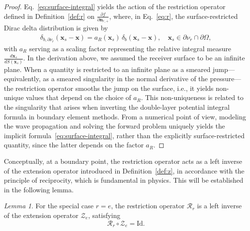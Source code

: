 \documentclass[11pt,reqno]{amsart}
\theoremstyle{remark}
\theoremstyle{italic_lemma}
\newtheorem{lemma}{Lemma}
\newcommand{\bx}{\boldsymbol{x}}
\newcommand{\bn}{\boldsymbol{n}}
\begin{document}
\begin{proof}
\noindent
Eq.~\eqref{eq:surface-integral} yields the action of the restriction operator 
defined in Definition~\ref{def:r} on \(\tfrac{\partial f}{\partial \bn_{r,+}}\), 
where, in Eq.~\eqref{eq:r}, the surface-restricted Dirac delta distribution is 
given by
\begin{align}  \label{eq:dirac-delta-surface}
    \delta_{b,\partial \nu_r}(\bx_s - \bx) 
    = a_R(\bx_s)  \, \delta_b(\bx_s - \bx),\quad \bx_s \in \partial \nu_r \cap \partial \Omega ,
\end{align}
with \( a_R \) serving as a scaling factor representing the relative integral measure \( \frac{d \bx_s}{dS(\bx_s)} \). In the derivation above, we assumed the receiver surface to be an infinite plane. When a quantity is restricted to an infinite plane as a smeared jump—equivalently, as a smeared singularity in the normal derivative of the pressure—the restriction operator smooths the jump on the surface, i.e., it yields non-unique values that depend on the choice of \( a_R \). This non-uniqueness is related to the singularity that arises when inverting the double-layer potential integral formula in boundary element methods. From a numerical point of view, modeling the wave propagation and solving the forward problem uniquely yields the implicit formula~\eqref{eq:surface-integral}, rather than the explicitly surface-restricted quantity, since the latter depends on the factor \( a_R \).


\end{proof}


\noindent
Conceptually, at a boundary point, the restriction operator acts as a left inverse of the extension operator introduced in Definition~\ref{def:z}, in accordance with the principle of reciprocity, which is fundamental in physics. This will be established in the following lemma.


\begin{lemma} \label{lemma:inverse-re}
For the special case \( r = e \), the restriction operator \( \mathcal{R}_r \) is a left inverse of the extension operator \( \mathcal{Z}_e \), satisfying
\[
\mathcal{R}_r \circ \mathcal{Z}_e = \mathrm{Id}.
\] 
\end{lemma}
\end{document}
